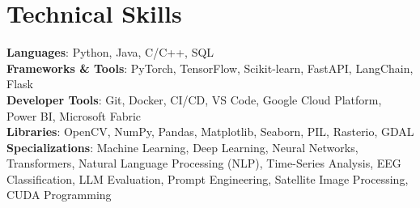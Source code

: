 \documentclass[letterpaper,11pt]{article}
\begin{document}
\section{Technical Skills}
\begin{itemize}[leftmargin=0.15in, label={}]
  \small{\item{
    \textbf{Languages}{: Python, Java, C/C++, SQL} \\
    \textbf{Frameworks \& Tools}{: PyTorch, TensorFlow, Scikit-learn, FastAPI, LangChain, Flask} \\
    \textbf{Developer Tools}{: Git, Docker, CI/CD, VS Code, Google Cloud Platform, Power BI, Microsoft Fabric} \\
    \textbf{Libraries}{: OpenCV, NumPy, Pandas, Matplotlib, Seaborn, PIL, Rasterio, GDAL} \\
    \textbf{Specializations}{: Machine Learning, Deep Learning, Neural Networks, Transformers, Natural Language Processing (NLP), Time-Series Analysis, EEG Classification, LLM Evaluation, Prompt Engineering, Satellite Image Processing, CUDA Programming}
  }}
\end{itemize}


\end{document}
